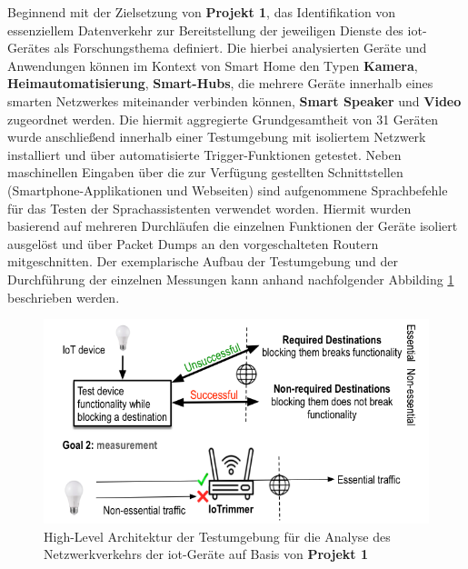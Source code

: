 \noindent Beginnend mit der Zielsetzung von \textbf{Projekt 1}, das Identifikation von essenziellem Datenverkehr zur Bereitstellung der jeweiligen Dienste des \ac{iot}-Gerätes als Forschungsthema definiert. Die hierbei analysierten Geräte und Anwendungen können im Kontext von Smart Home den Typen \textbf{Kamera}, \textbf{Heimautomatisierung}, \textbf{Smart-Hubs}, die mehrere Geräte innerhalb eines smarten Netzwerkes miteinander verbinden können, \textbf{Smart Speaker} und \textbf{Video} zugeordnet werden. Die hiermit aggregierte Grundgesamtheit von 31 Geräten wurde anschließend innerhalb einer Testumgebung mit isoliertem Netzwerk installiert und über automatisierte Trigger-Funktionen getestet. Neben maschinellen Eingaben über die zur Verfügung gestellten Schnittstellen (Smartphone-Applikationen und Webseiten) sind aufgenommene Sprachbefehle für das Testen der Sprachassistenten verwendet worden. Hiermit wurden basierend auf mehreren Durchläufen die einzelnen Funktionen der Geräte isoliert ausgelöst und über Packet Dumps an den vorgeschalteten Routern mitgeschnitten.
Der exemplarische Aufbau der Testumgebung und der Durchführung der einzelnen Messungen kann anhand nachfolgender Abbilding \ref{fig:test-setup-proj1} beschrieben werden.
\begin{figure}
    \centering
    \includegraphics[scale=0.35]{main/pictures/countermeasures/IoTrimmer_IoTrigger}
    \caption{High-Level Architektur der Testumgebung für die Analyse des Netzwerkverkehrs der \ac{iot}-Geräte auf Basis von \textbf{Projekt 1} \cite{Mandalari2021}}
    \label{fig:test-setup-proj1}
\end{figure}

